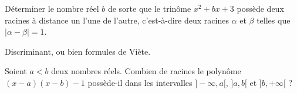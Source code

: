 \begin{exo}
Déterminer le nombre réel $b$ de sorte que le trinôme $x^2+bx+3$ possède deux racines à distance un l'une de l'autre, c'est-à-dire deux racines $\alpha$ et $\beta$ telles que $|\alpha-\beta|=1$.
\begin{hint}
\end{hint}
\begin{sol}
Discriminant, ou bien formules de Viète.
\end{sol}
\end{exo}

\begin{exo}
Soient $a<b$ deux nombres réels.
Combien de racines le polynôme $(x-a)(x-b)-1$ possède-il dans les intervalles $]-\infty, a[$,  $]a,b[$ et  $]b,+\infty[$ ?
\begin{hint}
\end{hint}
\begin{sol}
\end{sol}
\end{exo}



\begin{exo}
\begin{hint}
\end{hint}
\begin{sol}
\end{sol}
\end{exo}



\begin{exo}
\begin{hint}
\end{hint}
\begin{sol}
\end{sol}
\end{exo}



\begin{exo}
\begin{hint}
\end{hint}
\begin{sol}
\end{sol}
\end{exo}



\begin{exo}
\begin{hint}
\end{hint}
\begin{sol}
\end{sol}
\end{exo}





\indications
\correction



